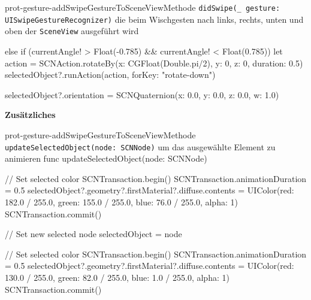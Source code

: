 \begin{description}
\begin{code}{prot-gesture-addSwipeGestureToSceneView}{Methode \texttt{didSwipe(_ gesture: UISwipeGestureRecognizer)} die beim Wischgesten nach links, rechts, unten und oben der \texttt{SceneView} ausgeführt wird}
{{{            }
            else if (currentAngle! > Float(-0.785) && currentAngle! < Float(0.785)) {
                let action = SCNAction.rotateBy(x: CGFloat(Double.pi/2), y: 0, z: 0, duration: 0.5)
                selectedObject?.runAction(action, forKey: "rotate-down")
            }
            
        }
        selectedObject?.orientation = SCNQuaternion(x: 0.0, y: 0.0, z: 0.0, w: 1.0)
    }
    \end{code}

    \textbf{Zusätzliches}\\

    \begin{code}{prot-gesture-addSwipeGestureToSceneView}{Methode \texttt{updateSelectedObject(node: SCNNode)} um das ausgewählte Element zu animieren}
    func updateSelectedObject(node: SCNNode) {
        // Set selected color
        SCNTransaction.begin()
        SCNTransaction.animationDuration = 0.5
        selectedObject?.geometry?.firstMaterial?.diffuse.contents = UIColor(red: 182.0 / 255.0, green: 155.0 / 255.0, blue: 76.0 / 255.0, alpha: 1)
        SCNTransaction.commit()
        
        // Set new selected node
        selectedObject = node
        
        // Set selected color
        SCNTransaction.begin()
        SCNTransaction.animationDuration = 0.5
        selectedObject?.geometry?.firstMaterial?.diffuse.contents = UIColor(red: 130.0 / 255.0, green: 82.0 / 255.0, blue: 1.0 / 255.0, alpha: 1)
        SCNTransaction.commit()
    }
    \end{code}
    

\end{description}    
